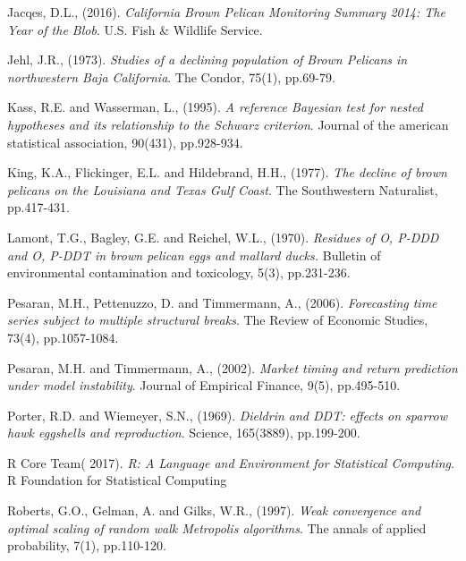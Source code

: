 \documentclass[submit]{smj}
\begin{document}
\begin{thebibliography}{99}
Jacqes, D.L., (2016). 
\textit{California Brown Pelican Monitoring Summary 2014: The Year of the Blob}. 
U.S. Fish \& Wildlife Service.

Jehl, J.R., (1973). 
\textit{Studies of a declining population of Brown Pelicans in northwestern Baja California}. 
The Condor, 75(1), pp.69-79.

Kass, R.E. and Wasserman, L., (1995). 
\textit{A reference Bayesian test for nested hypotheses and its relationship to the Schwarz criterion}. 
Journal of the american statistical association, 90(431), pp.928-934.

King, K.A., Flickinger, E.L. and Hildebrand, H.H., (1977). 
\textit{The decline of brown pelicans on the Louisiana and Texas Gulf Coast}.
The Southwestern Naturalist, pp.417-431.

Lamont, T.G., Bagley, G.E. and Reichel, W.L., (1970). 
\textit{Residues of O, P-DDD and O, P-DDT in brown pelican eggs and mallard ducks.} Bulletin of environmental contamination and toxicology, 5(3), pp.231-236.


Pesaran, M.H., Pettenuzzo, D. and Timmermann, A., (2006). 
\textit{Forecasting time series subject to multiple structural breaks}. 
The Review of Economic Studies, 73(4), pp.1057-1084.

Pesaran, M.H. and Timmermann, A., (2002).
\textit{Market timing and return prediction under model instability}. 
Journal of Empirical Finance, 9(5), pp.495-510.

Porter, R.D. and Wiemeyer, S.N., (1969). 
\textit{Dieldrin and DDT: effects on sparrow hawk eggshells and reproduction}. 
Science, 165(3889), pp.199-200.

R Core Team( 2017). 
\textit{R: A Language and Environment for Statistical Computing}.
R Foundation for Statistical Computing

Roberts, G.O., Gelman, A. and Gilks, W.R., (1997). 
\textit{Weak convergence and optimal scaling of random walk Metropolis algorithms}. The annals of applied probability, 7(1), pp.110-120.


\end{thebibliography}
\end{document}
